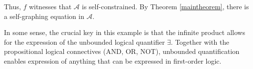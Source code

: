 \documentclass[table, svgnames, dvipsnames, letterpaper, 11pt]{report}
\theoremstyle{remark}
\begin{document}
Thus, $f$ witnesses that $\mathcal A$ is self-constrained.
By Theorem \ref{maintheorem}, there is a self-graphing equation in $\mathcal A$.

In some sense, the crucial key in this example is that the infinite product
allows for the expression of the unbounded logical quantifier $\exists$.
Together with the propositional logical connectives (AND, OR, NOT),
unbounded quantification enables expression of anything that can be expressed
in first-order logic.



\end{document}
